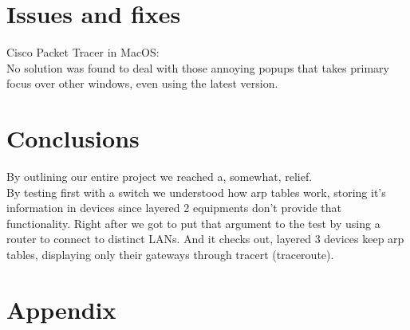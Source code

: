\documentclass[11pt,a4paper]{report}
\begin{document}
\chapter{Issues and fixes}
    Cisco Packet Tracer in MacOS:\\
        \hspace*{10mm}No solution was found to deal with those annoying popups that takes primary focus over other windows, even using the latest version.

\chapter{Conclusions}
    By outlining our entire project we reached a, somewhat, relief.\\
    By testing first with a switch we understood how arp tables work, storing it's information in devices since layered 2 equipments don't provide that functionality. Right after we got to put that argument to the test by using a router to connect to distinct LANs. And it checks out, layered 3 devices keep arp tables, displaying only their gateways through tracert (traceroute).

%
%

\appendix
\chapter{Appendix}
\end{document}
